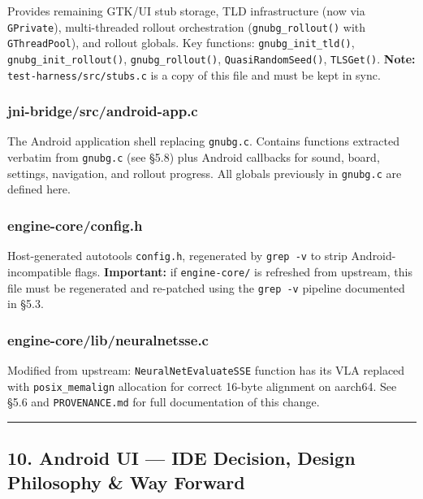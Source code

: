 \documentclass[11pt,a4paper]{article}
\begin{document}
Provides remaining GTK/UI stub storage, TLD infrastructure (now via
\texttt{GPrivate}), multi-threaded rollout orchestration
(\texttt{gnubg\_rollout()} with \texttt{GThreadPool}), and rollout
globals. Key functions: \texttt{gnubg\_init\_tld()},
\texttt{gnubg\_init\_rollout()}, \texttt{gnubg\_rollout()},
\texttt{QuasiRandomSeed()}, \texttt{TLSGet()}. \textbf{Note:}
\texttt{test-harness/src/stubs.c} is a copy of this file and must be
kept in sync.

\subsubsection{jni-bridge/src/android-app.c}\label{jni-bridgesrcandroid-app.c}

The Android application shell replacing \texttt{gnubg.c}. Contains
functions extracted verbatim from \texttt{gnubg.c} (see §5.8) plus
Android callbacks for sound, board, settings, navigation, and rollout
progress. All globals previously in \texttt{gnubg.c} are defined here.

\subsubsection{engine-core/config.h}\label{engine-coreconfig.h}

Host-generated autotools \texttt{config.h}, regenerated by
\texttt{grep\ -v} to strip Android-incompatible flags.
\textbf{Important:} if \texttt{engine-core/} is refreshed from upstream,
this file must be regenerated and re-patched using the \texttt{grep\ -v}
pipeline documented in §5.3.

\subsubsection{engine-core/lib/neuralnetsse.c}\label{engine-corelibneuralnetsse.c}

Modified from upstream: \texttt{NeuralNetEvaluateSSE} function has its
VLA replaced with \texttt{posix\_memalign} allocation for correct
16-byte alignment on aarch64. See §5.6 and \texttt{PROVENANCE.md} for
full documentation of this change.

\begin{center}\rule{0.5\linewidth}{0.5pt}\end{center}

\subsection{10. Android UI --- IDE Decision, Design Philosophy \& Way
Forward}\label{android-ui-ide-decision-design-philosophy}
\end{document}
